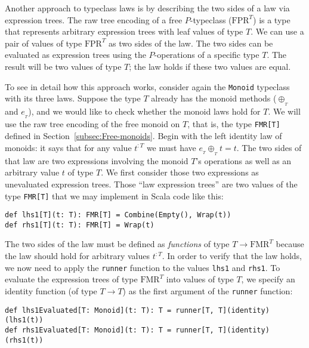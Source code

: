 Another approach to typeclass laws is by describing the two sides
of a law via expression trees. The raw tree encoding of a free $P$-typeclass
($\text{FPR}^{T}$) is a type that represents arbitrary expression
trees with leaf values of type $T$. We can use a pair of values of
type $\text{FPR}^{T}$ as two sides of the law. The two sides can
be evaluated as expression trees using the $P$-operations of a specific
type $T$. The result will be two values of type $T$; the law holds
if these two values are equal.

To see in detail how this approach works, consider again the \lstinline!Monoid!
typeclass with its three laws. Suppose the type $T$ already has the
monoid methods ($\oplus_{_{T}}$ and $e_{_{T}}$), and we would like
to check whether the monoid laws hold for $T$. We will use the raw
tree encoding of the free monoid on $T$, that is, the type \lstinline!FMR[T]!
defined in Section~\ref{subsec:Free-monoids}. Begin with the left
identity law of monoids: it says that for any value $t^{:T}$ we must
have $e_{_{T}}\oplus_{_{T}}t=t$. The two sides of that law are two
expressions involving the monoid $T$\textsf{'}s operations as well as an arbitrary
value $t$ of type $T$. We first consider those two expressions as
unevaluated expression trees. Those \textsf{``}law expression trees\textsf{''} are
two values of the type \lstinline!FMR[T]!
that we may implement in Scala code like this:
\begin{lstlisting}
def lhs1[T](t: T): FMR[T] = Combine(Empty(), Wrap(t))
def rhs1[T](t: T): FMR[T] = Wrap(t)
\end{lstlisting}
The two sides of the law must be defined as \emph{functions} of type
$T\rightarrow\text{FMR}^{T}$ because the law should hold for arbitrary
values $t^{:T}$. In order to verify that the law holds, we now need
to apply the \lstinline!runner!
function to the values \lstinline!lhs1!
and \lstinline!rhs1!. To
evaluate the expression trees of type $\text{FMR}^{T}$ into values
of type $T$, we specify an identity function (of type $T\rightarrow T$)
as the first argument of the \lstinline!runner!
function:
\begin{lstlisting}
def lhs1Evaluated[T: Monoid](t: T): T = runner[T, T](identity)(lhs1(t))
def rhs1Evaluated[T: Monoid](t: T): T = runner[T, T](identity)(rhs1(t))
\end{lstlisting}

